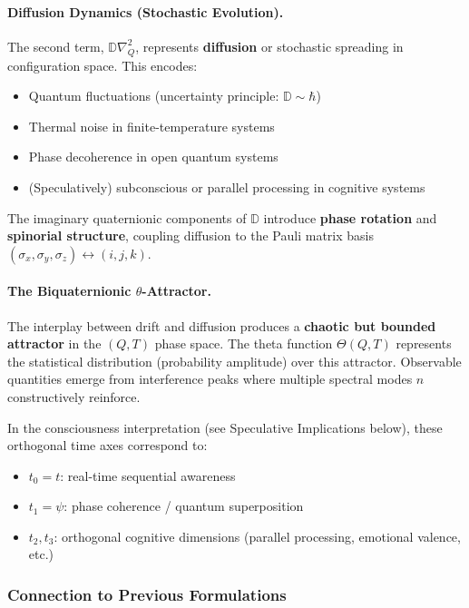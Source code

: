 \paragraph{Diffusion Dynamics (Stochastic Evolution).}
The second term, $\mathbb{D}\nabla_Q^2$, represents \textbf{diffusion} or stochastic spreading in configuration space. This encodes:
\begin{itemize}
\item Quantum fluctuations (uncertainty principle: $\mathbb{D} \sim \hbar$)
\item Thermal noise in finite-temperature systems
\item Phase decoherence in open quantum systems
\item (Speculatively) subconscious or parallel processing in cognitive systems
\end{itemize}

The imaginary quaternionic components of $\mathbb{D}$ introduce \textbf{phase rotation} and \textbf{spinorial structure}, coupling diffusion to the Pauli matrix basis $(\sigma_x, \sigma_y, \sigma_z) \leftrightarrow (i, j, k)$.

\paragraph{The Biquaternionic $\theta$-Attractor.}
The interplay between drift and diffusion produces a \textbf{chaotic but bounded attractor} in the $(Q,T)$ phase space. The theta function $\Theta(Q,T)$ represents the statistical distribution (probability amplitude) over this attractor. Observable quantities emerge from interference peaks where multiple spectral modes $n$ constructively reinforce.

In the consciousness interpretation (see Speculative Implications below), these orthogonal time axes correspond to:
\begin{itemize}
\item $t_0 = t$: real-time sequential awareness
\item $t_1 = \psi$: phase coherence / quantum superposition
\item $t_2, t_3$: orthogonal cognitive dimensions (parallel processing, emotional valence, etc.)
\end{itemize}

\subsubsection{Connection to Previous Formulations}

